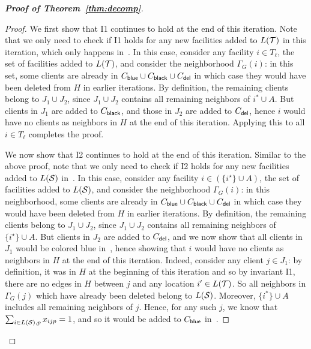\begin{proof}[{\bf Proof of Theorem~\ref{thm:decomp}}]
\begin{proof}
\medskip \noindent We first show that I1 continues to hold at the end of this iteration. Note that we only need to check if I1 holds for any new facilities added to $L({\cal T})$ in this iteration, which only happens in~. In this case, consider any facility $i \in T_\ell$, the set of facilities added to $L({\cal T})$, and consider the neighborhood $\Gamma_G(i)$: in this set, some clients are already in $C_{\mathsf{blue}} \cup C_{\mathsf{black}} \cup C_{\mathsf{del}}$ in which case they would have been deleted from $H$ in earlier iterations. By definition, the remaining clients belong to $J_1 \cup J_2$, since $J_1 \cup J_2$ contains all remaining neighbors of $i^* \cup A$. But clients in $J_1$ are added to $C_{\mathsf{black}}$, and those in $J_2$ are added to $C_{\mathsf{del}}$, hence $i$ would have no  clients as neighbors in $H$ at the end of this iteration. Applying this to all $i \in T_\ell$ completes the proof.

\medskip \noindent We now show that I2 continues to hold at the end of this iteration. Similar to the above proof, note that we only need to check if I2 holds for any new facilities added to $L({\cal S})$ in~. In this case, consider any facility $i \in (\{i^\star\} \cup A)$, the set of facilities added to $L({\cal S})$, and consider the neighborhood $\Gamma_G(i)$: in this neighborhood, some clients are already in $C_{\mathsf{blue}} \cup C_{\mathsf{black}} \cup C_{\mathsf{del}}$ in which case they would have been deleted from $H$ in earlier iterations. By definition, the remaining clients belong to $J_1 \cup J_2$, since $J_1 \cup J_2$ contains all remaining neighbors of $\{i^\star \} \cup A$. But clients in $J_2$ are added to $C_{\mathsf{del}}$, and we now show that all clients in $J_1$ would be colored blue in~, hence showing that $i$ would have no clients as neighbors in $H$ at the end of this iteration.
Indeed, consider any client $j \in J_1$: by definition, it was in $H$ at the beginning of this iteration and so by invariant I1, there are no edges in $H$ between $j$ and any location $i' \in L({\cal T})$. So all neighbors in $\Gamma_G(j)$ which have already been deleted belong to $L({\cal S})$. Moreover, $\{i^*\} \cup A$ includes all remaining neighbors of $j$. Hence, for any such $j$, we know that $\sum_{i \in L({\cal S}), p} x_{ijp} = 1$, and so it would be 
added to $C_{\mathsf{blue}}$ in~.
\end{proof}


\end{proof}
